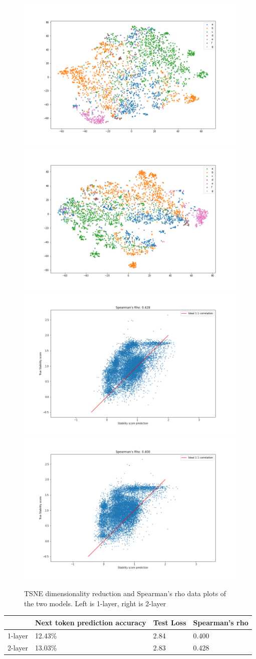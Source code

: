 \begin{figure}[!ht]
  \centering
  \includegraphics[width=0.49\linewidth]{latex/imgs/tsne_1_layer_with_schedule_512_final.png}
  \includegraphics[width=0.49\linewidth]{latex/imgs/tsne_2_layer_no_drop_final.png}
  \includegraphics[width=0.49\linewidth]{latex/imgs/spearman_1_layer_with_schedule_512_final.png}
  \includegraphics[width=0.49\linewidth]{latex/imgs/spearman_2_layer_no_drop_final.png}
  \caption{TSNE dimensionality reduction  and Spearman's rho data plots of the two models. Left is 1-layer, right is 2-layer}
\end{figure}

\begin{table}[!ht]
\begin{tabular}{|l|l|l|l|}
\hline
        & Next token prediction accuracy & Test Loss & Spearman's rho\\ \hline
1-layer & 12.43\%                        & 2.84      & 0.400         \\ \hline
2-layer & 13.03\%                        & 2.83      & 0.428         \\ \hline
\end{tabular}
\end{table}